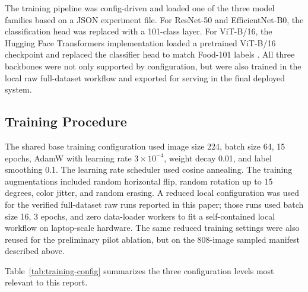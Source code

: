 \documentclass[sigconf,nonacm,11pt]{acmart}
\begin{document}
The training pipeline was config-driven and loaded one of the three model families based on a JSON experiment file. For ResNet-50 and EfficientNet-B0, the classification head was replaced with a 101-class layer. For ViT-B/16, the Hugging Face Transformers implementation loaded a pretrained ViT-B/16 checkpoint and replaced the classifier head to match Food-101 labels \cite{transformers}. All three backbones were not only supported by configuration, but were also trained in the local raw full-dataset workflow and exported for serving in the final deployed system.

\subsection{Training Procedure}
The shared base training configuration used image size 224, batch size 64, 15 epochs, AdamW with learning rate $3 \times 10^{-4}$, weight decay 0.01, and label smoothing 0.1. The learning rate scheduler used cosine annealing. The training augmentations included random horizontal flip, random rotation up to 15 degrees, color jitter, and random erasing. A reduced local configuration was used for the verified full-dataset raw runs reported in this paper; those runs used batch size 16, 3 epochs, and zero data-loader workers to fit a self-contained local workflow on laptop-scale hardware. The same reduced training settings were also reused for the preliminary pilot ablation, but on the 808-image sampled manifest described above.

Table~\ref{tab:training-config} summarizes the three configuration levels most relevant to this report.
\end{document}
